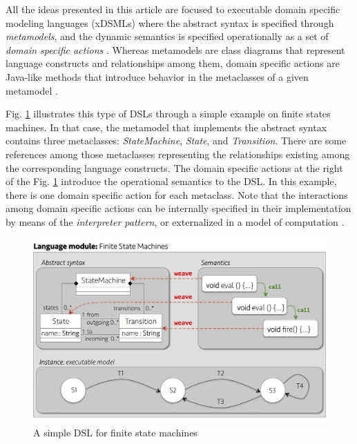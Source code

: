 All the ideas presented in this article are focused to executable domain specific modeling languages (xDSMLs) where the abstract syntax is specified through \textit{metamodels}, and the dynamic semantics is specified operationally as a set of \textit{domain specific actions} \cite{Combemale:2013}. Whereas metamodels are class diagrams that represent language constructs and relationships among them, domain specific actions are Java-like methods that introduce behavior in the metaclasses of a given metamodel \cite{Jezequel:2015b}. 

Fig. \ref{fig:fig-dsl-example} illustrates this type of DSLs through a simple example on finite states machines. In that case, the metamodel that implements the abstract syntax contains three metaclasses: \textsl{StateMachine}, \textsl{State}, and \textsl{Transition}. There are some references among those metaclasses representing the relationships existing among the corresponding language constructs. The domain specific actions at the right of the Fig. \ref{fig:fig-dsl-example} introduce the operational semantics to the DSL. In this example, there is one domain specific action for each metaclass. Note that the interactions among domain specific actions can be internally specified in their implementation by means of the \textit{interpreter pattern}, or externalized in a model of computation \cite{Combemale:2013}.

\begin{figure}
\centering
\includegraphics[width=1\linewidth]{images/fig-dsl-example.png}
\caption{A simple DSL for finite state machines}
\label{fig:fig-dsl-example}
\end{figure}
